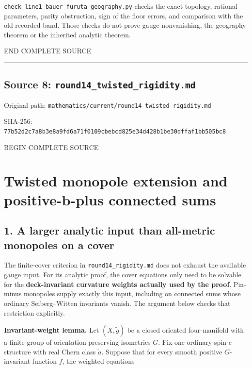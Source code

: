 \documentclass[
  10pt,
]{article}
\begin{document}
\nolinkurl{check_line1_bauer_furuta_geography.py} checks the exact
topology, rational parameters, parity obstruction, sign of the floor
errors, and comparison with the old recorded band. Those checks do not
prove gauge nonvanishing, the geography theorem or the inherited
analytic theorem.

END COMPLETE SOURCE

\begin{center}\rule{0.5\linewidth}{0.5pt}\end{center}

\hypertarget{source-8-round14_twisted_rigidity.md}{%
\subsection{Source 8:
\nolinkurl{round14_twisted_rigidity.md}}\label{source-8-round14_twisted_rigidity.md}}

Original path:
\nolinkurl{mathematics/current/round14_twisted_rigidity.md}

SHA-256:
\nolinkurl{77b52d2c7a8b3e8a9fd6a71f0109cbebcd825e34d428b1be30dffaf1bb505bc8}

BEGIN COMPLETE SOURCE

\hypertarget{twisted-monopole-extension-and-positive-b-plus-connected-sums}{%
\section{Twisted monopole extension and positive-b-plus connected
sums}\label{twisted-monopole-extension-and-positive-b-plus-connected-sums}}

\hypertarget{a-larger-analytic-input-than-all-metric-monopoles-on-a-cover}{%
\subsection{1. A larger analytic input than all-metric monopoles on a
cover}\label{a-larger-analytic-input-than-all-metric-monopoles-on-a-cover}}

The finite-cover criterion in \nolinkurl{round14_rigidity.md} does not
exhaust the available gauge input. For its analytic proof, the cover
equations only need to be solvable for the \textbf{deck-invariant
curvature weights actually used by the proof}. Pin-minus monopoles
supply exactly this input, including on connected sums whose ordinary
Seiberg--Witten invariants vanish. The argument below checks that
restriction explicitly.

\textbf{Invariant-weight lemma.} Let \((\widetilde X,\widetilde g)\) be
a closed oriented four-manifold with a finite group of
orientation-preserving isometries \(G\). Fix one ordinary spin-c
structure with real Chern class \(\widetilde a\). Suppose that for every
smooth positive \(G\)-invariant function \(f\), the weighted equations
\end{document}
